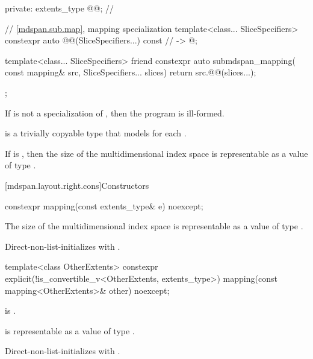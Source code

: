 \begin{codeblock}
{{  private:
    extents_type @@{};    // \expos

    // \ref{mdspan.sub.map},  mapping specialization
    template<class... SliceSpecifiers>
      constexpr auto @@(SliceSpecifiers...) const       // \expos
        -> @\seebelow@;

    template<class... SliceSpecifiers>
      friend constexpr auto submdspan_mapping(
        const mapping& src, SliceSpecifiers... slices) {
          return src.@@(slices...);
      }
  };
}
\end{codeblock}

\pnum
If  is not a specialization of ,
then the program is ill-formed.

\pnum
{} is a trivially copyable type
that models  for each .

\pnum
\mandates
If  is ,
then the size of the multidimensional index space 
is representable as a value of type .

[mdspan.layout.right.cons]{Constructors}

%
\begin{itemdecl}
constexpr mapping(const extents_type& e) noexcept;
\end{itemdecl}

\begin{itemdescr}
\pnum
\expects
The size of the multidimensional index space  is representable as
a value of type .

\pnum
\effects
Direct-non-list-initializes  with .
\end{itemdescr}

%
\begin{itemdecl}
template<class OtherExtents>
  constexpr explicit(!is_convertible_v<OtherExtents, extents_type>)
    mapping(const mapping<OtherExtents>& other) noexcept;
\end{itemdecl}

\begin{itemdescr}
\pnum
\constraints
{} is .

\pnum
\expects
{} is representable as
a value of type .

\pnum
\effects
Direct-non-list-initializes  with .
\end{itemdescr}


